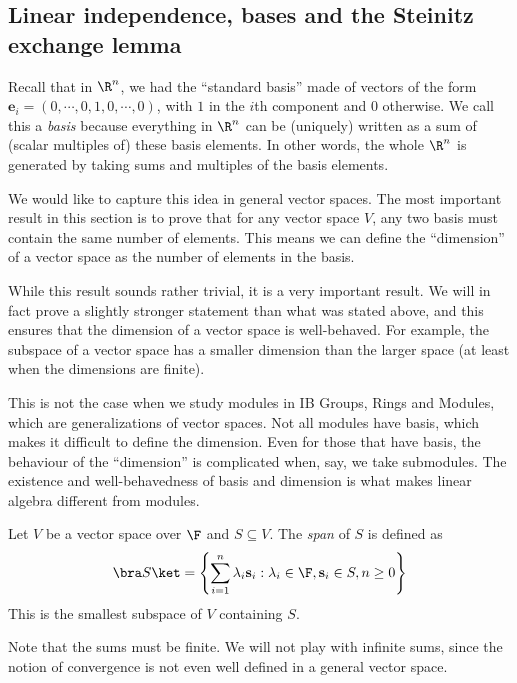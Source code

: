\documentclass[a4paper]{article}
\begin{document}
\subsection{Linear independence, bases and the Steinitz exchange lemma}
Recall that in $\R^n$, we had the ``standard basis'' made of vectors of the form $\mathbf{e}_i = (0, \cdots, 0, 1, 0, \cdots, 0)$, with $1$ in the $i$th component and $0$ otherwise. We call this a \emph{basis} because everything in $\R^n$ can be (uniquely) written as a sum of (scalar multiples of) these basis elements. In other words, the whole $\R^n$ is generated by taking sums and multiples of the basis elements.

We would like to capture this idea in general vector spaces. The most important result in this section is to prove that for any vector space $V$, any two basis must contain the same number of elements. This means we can define the ``dimension'' of a vector space as the number of elements in the basis.

While this result sounds rather trivial, it is a very important result. We will in fact prove a slightly stronger statement than what was stated above, and this ensures that the dimension of a vector space is well-behaved. For example, the subspace of a vector space has a smaller dimension than the larger space (at least when the dimensions are finite).

This is not the case when we study modules in IB Groups, Rings and Modules, which are generalizations of vector spaces. Not all modules have basis, which makes it difficult to define the dimension. Even for those that have basis, the behaviour of the ``dimension'' is complicated when, say, we take submodules. The existence and well-behavedness of basis and dimension is what makes linear algebra different from modules.

\begin{defi}[Span]
  Let $V$ be a vector space over $\F$ and $S\subseteq V$. The \emph{span} of $S$ is defined as
  \[
    \bra S\ket = \left\{\sum_{i = 1}^n \lambda_i \mathbf{s}_i : \lambda_i \in \F, \mathbf{s}_i \in S, n \geq 0\right\}
  \]
  This is the smallest subspace of $V$ containing $S$.

  Note that the sums must be finite. We will not play with infinite sums, since the notion of convergence is not even well defined in a general vector space.
\end{defi}
\end{document}
